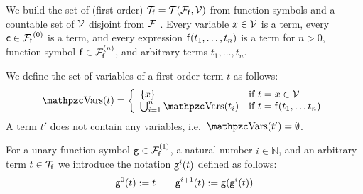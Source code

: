 
\begin{definition}\label{def:terms}
	We build the set of (first order) \( \mcTf = \mcTFfV \)
	from function symbols and a
	countable set of \( \mcV \) disjoint from \( \mcF \) \!.
	Every variable \( x\in\mcV \) is a term,
	every  \( \mc\in\mcFf^{(0)} \) is a term,
	and every expression \( \mf(t_1,\ldots,t_n) \) is a term
	for \( n>0 \), function symbol \( \mf\in\mcFfn \),
	and arbitrary terms \( t_1,\ldots,t_n \).
\end{definition}

\begin{definition}\label{def:term:vars}\label{def:term:ground}
	We define the set of variables of a first order term \( t \) as follows:
	\begin{gather*}
	\MDEFINE{\var(t)}{ll}{
		\{ x \} & \text{if } t = x \in \mcV \\
		\bigcup_{i=1}^n \var(t_i) & \text{if }  t = \mf(t_1, \ldots t_n)
	}
	\end{gather*}
	A  term \( t' \) does not contain any variables, i.e.~\( \var(t') = \emptyset \).
\end{definition}

\begin{definition}\label{def:unary:power}
	For a unary function symbol \( \mg\in\mcFfn[1] \), a natural number
	\( i\in\mathbb{N} \), and an arbitrary term \( t\in\mcTf \) we introduce the notation \( \mg^i(t) \) defined as follows:
	\[
	\mg^0(t) := t \qquad
	\mg^{i+1}(t) := \mg(\mg^i(t))
	\]
\end{definition}
